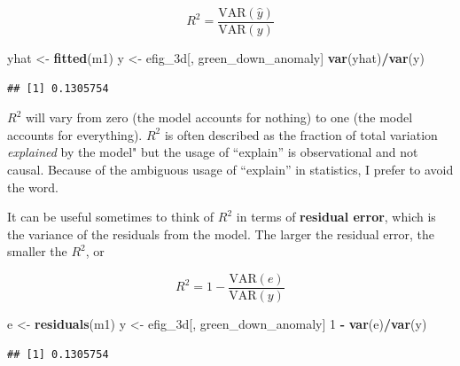 \documentclass[]{book}
\newenvironment{Shaded}{\begin{snugshade}}{\end{snugshade}}
\newcommand{\DecValTok}[1]{\textcolor[rgb]{0.00,0.00,0.81}{#1}}
\newcommand{\KeywordTok}[1]{\textcolor[rgb]{0.13,0.29,0.53}{\textbf{#1}}}
\newcommand{\NormalTok}[1]{#1}
\newcommand{\OperatorTok}[1]{\textcolor[rgb]{0.81,0.36,0.00}{\textbf{#1}}}
\newcommand{\StringTok}[1]{\textcolor[rgb]{0.31,0.60,0.02}{#1}}
\begin{document}
\begin{equation}
R^2 = \frac{\mathrm{VAR}(\hat{y})}{\mathrm{VAR}(y)}
\end{equation}

\begin{Shaded}
\begin{Highlighting}[]
\NormalTok{yhat <-}\StringTok{ }\KeywordTok{fitted}\NormalTok{(m1)}
\NormalTok{y <-}\StringTok{ }\NormalTok{efig_3d[, green_down_anomaly]}
\KeywordTok{var}\NormalTok{(yhat)}\OperatorTok{/}\KeywordTok{var}\NormalTok{(y)}
\end{Highlighting}
\end{Shaded}

\begin{verbatim}
## [1] 0.1305754
\end{verbatim}

\(R^2\) will vary from zero (the model accounts for nothing) to one (the model accounts for everything). \(R^2\) is often described as the fraction of total variation \emph{explained} by the model" but the usage of ``explain'' is observational and not causal. Because of the ambiguous usage of ``explain'' in statistics, I prefer to avoid the word.

It can be useful sometimes to think of \(R^2\) in terms of \textbf{residual error}, which is the variance of the residuals from the model. The larger the residual error, the smaller the \(R^2\), or

\begin{equation}
R^2 = 1 - \frac{\mathrm{VAR}(e)}{\mathrm{VAR}(y)}
\end{equation}

\begin{Shaded}
\begin{Highlighting}[]
\NormalTok{e <-}\StringTok{ }\KeywordTok{residuals}\NormalTok{(m1)}
\NormalTok{y <-}\StringTok{ }\NormalTok{efig_3d[, green_down_anomaly]}
\DecValTok{1} \OperatorTok{-}\StringTok{ }\KeywordTok{var}\NormalTok{(e)}\OperatorTok{/}\KeywordTok{var}\NormalTok{(y)}
\end{Highlighting}
\end{Shaded}

\begin{verbatim}
## [1] 0.1305754
\end{verbatim}
\end{document}
